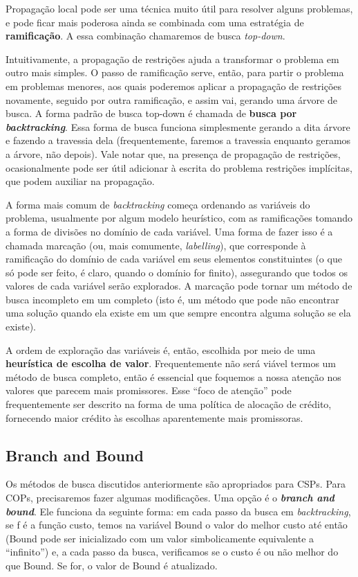 \documentclass{article}
\theoremstyle{remark}
\theoremstyle{theorem}
\begin{document}
Propagação local pode ser uma técnica muito útil para resolver alguns problemas, e pode ficar mais poderosa ainda se combinada com uma estratégia de \textbf{ramificação}. A essa combinação chamaremos de busca \textit{top-down}.

Intuitivamente, a propagação de restrições ajuda a transformar o problema em outro mais simples. O passo de ramificação serve, então, para partir o problema em problemas menores, aos quais poderemos aplicar a propagação de restrições novamente, seguido por outra ramificação, e assim vai, gerando uma árvore de busca. A forma padrão de busca top-down é chamada de \textbf{busca por \textit{backtracking}}. Essa forma de busca funciona simplesmente
gerando a dita árvore e fazendo a travessia dela (frequentemente, faremos a travessia enquanto geramos a árvore, não depois). Vale notar que, na presença de propagação de restrições, ocasionalmente pode ser útil adicionar à escrita do problema restrições implícitas, que podem auxiliar na propagação.

A forma mais comum de \textit{backtracking} começa ordenando as variáveis do problema, usualmente por algum modelo heurístico, com as ramificações tomando a forma de divisões no domínio de cada variável. Uma forma de fazer isso é a chamada marcação (ou, mais comumente, \textit{labelling}), que corresponde à ramificação do domínio de cada variável em seus elementos constituintes (o que só pode ser feito, é claro, quando o domínio for finito), assegurando que todos os valores de cada variável
serão explorados. A marcação pode tornar um método de busca incompleto em um completo (isto é, um método que pode não encontrar uma solução quando ela existe em um que sempre encontra alguma solução se ela existe).

A ordem de exploração das variáveis é, então, escolhida por meio de uma \textbf{heurística de escolha de valor}. Frequentemente não será viável termos um método de busca completo, então é essencial que foquemos a nossa atenção nos valores que parecem mais promissores. Esse ``foco de atenção'' pode frequentemente ser descrito na forma de uma política de alocação de crédito, fornecendo maior crédito às escolhas aparentemente mais promissoras.

\subsection{Branch and Bound}

Os métodos de busca discutidos anteriormente são apropriados para CSPs. Para COPs, precisaremos fazer algumas modificações. Uma opção é o \textit{\textbf{branch and bound}}. Ele funciona da seguinte forma: em cada passo da busca em \textit{backtracking}, se f é a função custo, temos na variável Bound o valor do melhor custo até então (Bound pode ser inicializado com um valor simbolicamente equivalente a ``infinito'') e, a cada passo da busca, verificamos se o custo é ou não melhor do que Bound. Se for, o valor de Bound é atualizado.
\end{document}
